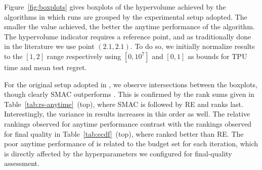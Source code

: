 Figure~\ref{fig:boxplots} gives  boxplots of the hypervolume achieved by the algorithms in which runs are grouped by the experimental setup adopted. The smaller the value achieved, the better the anytime performance of the algorithm. The hypervolume indicator requires a reference point, and as traditionally done in the literature we use point $(2.1, 2.1)$. To do so, we initially normalize results to the $[1,2]$ range respectively using $[0,10^7]$ and $[0,1]$ as bounds for TPU time and mean test regret. 

For the original setup adopted in \nasbench, we observe intersections between the boxplots, though clearly SMAC outperforms \irace. This is confirmed by the rank sums given in Table~\ref{tab:rs-anytime}~(top), where SMAC is followed by RE and \irace ranks last. Interestingly, the variance in results increases in this order as well. The relative rankings observed for anytime performance contrast with the rankings observed for final quality in Table~\ref{tab:ecdf}~(top), where \irace ranked better than RE. The poor anytime performance of \irace is related to the budget set for each iteration, which is directly affected by the hyperparameters we configured for final-quality assessment. 

\begin{table}[!t]
    \centering
    \caption{Rank sum (RS) analysis of hypervolumes grouped by experimental setup~(top) and algorithm~(bottom). O: original; VS: variable-sized; C: caching; CVS: caching \& variable-sized. Best-ranked levels are highlighted when statistically different different than others.}
    \label{tab:rs-anytime}
    \\[1em]
    \quad
    \end{table}

